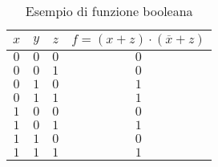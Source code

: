 \documentclass[a4paper]{extarticle}
\begin{document}
\begin{table}[H]
  \centering
  \begin{tabular}{ccc|c}
    $x$ & $y$ & $z$ & $f = (x + z) \cdot (\overline{x} + z)$\\
    \hline
    $0$ & $0$ & $0$ & $0$\\
    $0$ & $0$ & $1$ & $0$\\
    $0$ & $1$ & $0$ & $1$\\
    $0$ & $1$ & $1$ & $1$\\
    $1$ & $0$ & $0$ & $0$\\
    $1$ & $0$ & $1$ & $1$\\
    $1$ & $1$ & $0$ & $0$\\
    $1$ & $1$ & $1$ & $1$\\
  \end{tabular}
  \caption{Esempio di funzione booleana}
  \label{tab:esempio_funzione_boolena}
\end{table}
\end{document}
